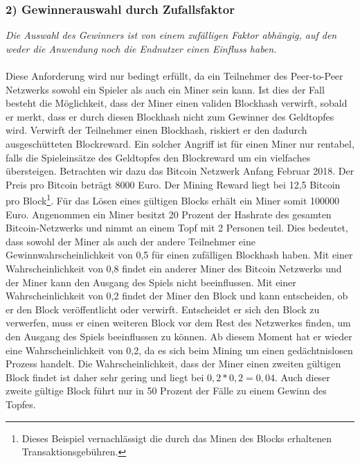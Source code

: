 \subsubsection{2) Gewinnerauswahl durch Zufallsfaktor}
\textit{Die Auswahl des Gewinners ist von einem zufälligen Faktor abhängig, auf den weder die Anwendung noch die Endnutzer einen Einfluss haben.}\\\\
Diese Anforderung wird nur bedingt erfüllt, da ein Teilnehmer des Peer-to-Peer Netzwerks sowohl ein Spieler als auch ein Miner sein kann. Ist dies der Fall besteht die Möglichkeit, dass der Miner einen validen Blockhash verwirft, sobald er merkt, dass er durch diesen Blockhash nicht zum Gewinner des Geldtopfes wird. Verwirft der Teilnehmer einen Blockhash, riskiert er den dadurch ausgeschütteten Blockreward. Ein solcher Angriff ist für einen Miner nur rentabel, falls die Spieleinsätze des Geldtopfes den Blockreward um ein vielfaches übersteigen.
Betrachten wir dazu das Bitcoin Netzwerk Anfang Februar 2018. Der Preis pro Bitcoin beträgt 8000 Euro. Der Mining Reward liegt bei 12,5 Bitcoin pro Block\footnote{Dieses Beispiel vernachlässigt die durch das Minen des Blocks erhaltenen Transaktionsgebühren.}. Für das Lösen eines gültigen Blocks erhält ein Miner somit 100000 Euro. Angenommen ein Miner besitzt 20 Prozent der Hashrate des gesamten Bitcoin-Netzwerks und nimmt an einem Topf mit 2 Personen teil. Dies bedeutet, dass sowohl der Miner als auch der andere Teilnehmer eine Gewinnwahrscheinlichkeit von 0,5 für einen zufälligen Blockhash haben.
Mit einer Wahrscheinlichkeit von 0,8 findet ein anderer Miner des Bitcoin Netzwerks und der Miner kann den Ausgang des Spiels nicht beeinflussen. Mit einer Wahrscheinlichkeit von 0,2 findet der Miner den Block und kann entscheiden, ob er den Block veröffentlicht oder verwirft. Entscheidet er sich den Block zu verwerfen, muss er einen weiteren Block vor dem Rest des Netzwerkes finden, um den Ausgang des Spiels beeinflussen zu können. Ab diesem Moment hat er wieder eine Wahrscheinlichkeit von 0,2, da es sich beim Mining um einen gedächtnislosen Prozess handelt. Die Wahrscheinlichkeit, dass der Miner einen zweiten gültigen Block findet ist daher sehr gering und liegt bei $0,2 * 0,2 = 0,04$. Auch dieser zweite gültige Block führt nur in 50 Prozent der Fälle zu einem Gewinn des Topfes.

